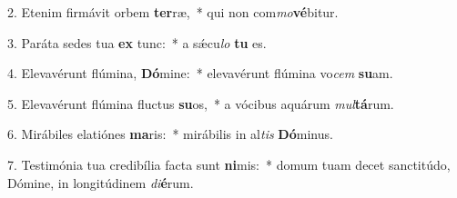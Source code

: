 2. Etenim firmávit orbem \textbf{ter}ræ,~*  qui non com\textit{mo}\textbf{vé}bitur.\

3. Paráta sedes tua \textbf{ex} tunc:~*  a sǽcu\textit{lo} \textbf{tu} es.\

4. Elevavérunt flúmina, \textbf{Dó}mine:~*  elevavérunt flúmina vo\textit{cem} \textbf{su}am.\

5. Elevavérunt flúmina fluctus \textbf{su}os,~*  a vócibus aquárum \textit{mul}\textbf{tá}rum.\

6. Mirábiles elatiónes \textbf{ma}ris:~*  mirábilis in al\textit{tis} \textbf{Dó}minus.\

7. Testimónia tua credibília facta sunt \textbf{ni}mis:~*  domum tuam decet sanctitúdo, Dómine, in longitúdinem \textit{di}\textbf{é}rum.\


